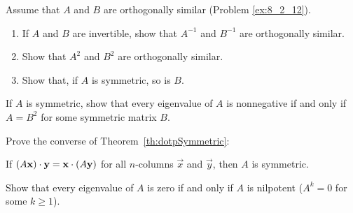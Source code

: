 \documentclass{ximera}
\begin{document}
\begin{problem}\label{prob:ortho14a}
Assume that $A$ and $B$ are orthogonally similar (Problem \ref{ex:8_2_12}).


\begin{enumerate} 
\item If $A$ and $B$ are invertible, show that $A^{-1}$ and $B^{-1}$ are orthogonally similar.

\item Show that $A^{2}$ and $B^{2}$ are orthogonally similar.

\item Show that, if $A$ is symmetric, so is $B$.

\end{enumerate}


\end{problem}

\begin{problem}\label{prob:ortho15}
If $A$ is symmetric, show that every eigenvalue of $A$ is nonnegative if and only if $A = B^{2}$ for some symmetric matrix $B$.
\end{problem}

\begin{problem}\label{ex:8_2_15}
Prove the converse of Theorem~\ref{th:dotpSymmetric}:

If $(A\mathbf{x}) \cdot \mathbf{y} = \mathbf{x} \cdot (A\mathbf{y})$ for all $n$-columns $\vec{x}$ and $\vec{y}$, then $A$ is symmetric.

\end{problem}

\begin{problem}\label{prob:ortho17}
Show that every eigenvalue of $A$ is zero if and only if $A$ is nilpotent ($A^{k} = 0$ for some $k \geq 1$).
\end{problem}
\end{document}
